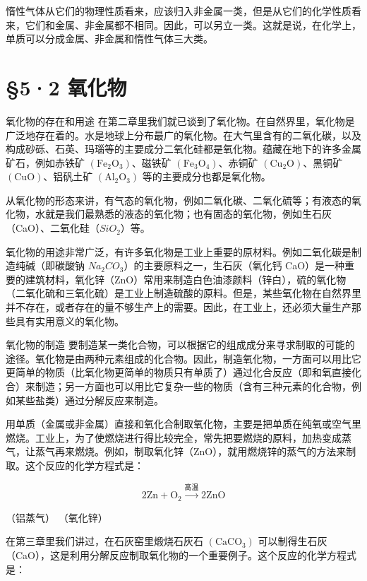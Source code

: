 惰性气体从它们的物理性质看来，应该归入非金属一类，但是从它们的化学性质看来，它们和金属、非金属都不相同。因此，可以另立一类。这就是说，在化学上，单质可以分成金属、非金属和惰性气体三大类。

\section{§5·2 氧化物}

氧化物的存在和用途
在第二章里我们就已谈到了氧化物。在自然界里，氧化物是广泛地存在着的。水是地球上分布最广的氧化物。在大气里含有的二氧化碳，以及构成砂砾、石英、玛瑙等的主要成分二氧化硅都是氧化物。蕴藏在地下的许多金属矿石，例如赤铁矿
\(\left(\mathrm{Fe}_{2}\mathrm{O}_{3}\right)\)、磁铁矿
\(\left(\mathrm{Fe}_{3}\mathrm{O}_{4}\right)\)、赤铜矿
\(\left(\mathrm{Cu}_{2}\mathrm{O}\right)\)、黑铜矿
\(\left(\mathrm{CuO}\right)\)、铝矾土矿
\(\left(\mathrm{Al}_{2}\mathrm{O}_{3}\right)\)
等的主要成分也都是氧化物。

从氧化物的形态来讲，有气态的氧化物，例如二氧化碳、二氧化硫等；有液态的氧化物，水就是我们最熟悉的液态的氧化物；也有固态的氧化物，例如生石灰（CaO）、二氧化硅（\(SiO_{2}\)）等。

氧化物的用途非常广泛，有许多氧化物是工业上重要的原材料。例如二氧化碳是制造纯碱（即碳酸钠
\(Na_{2}CO_{3}\)）的主要原料之一，生石灰（氧化钙
CaO）是一种重要的建筑材料，氧化锌（ZnO）常用来制造白色油漆颜料（锌白），硫的氧化物（二氧化硫和三氧化硫）是工业上制造硫酸的原料。但是，某些氧化物在自然界里并不存在，或者存在的量不够生产上的需要。因此，在工业上，还必须大量生产那些具有实用意义的氧化物。

氧化物的制造
要制造某一类化合物，可以根据它的组成成分来寻求制取的可能的途径。氧化物是由两种元素组成的化合物。因此，制造氧化物，一方面可以用比它更简单的物质（比氧化物更简单的物质只有单质了）通过化合反应（即和氧直接化合）来制造；另一方面也可以用比它复杂一些的物质（含有三种元素的化合物，例如某些盐类）通过分解反应来制造。

用单质（金属或非金属）直接和氧化合制取氧化物，主要是把单质在纯氧或空气里燃烧。工业上，为了使燃烧进行得比较完全，常先把要燃烧的原料，加热变成蒸气，让蒸气再来燃烧。例如，制取氧化锌（ZnO），就用燃烧锌的蒸气的方法来制取。这个反应的化学方程式是：

\[
2 \mathrm{Zn} + \mathrm{O}_{2} \xrightarrow {\text{高温}} 2 \mathrm{ZnO}
\]

（铝蒸气） （氧化锌）

在第三章里我们讲过，在石灰窑里煅烧石灰石
\(\left(\mathrm{CaCO}_{3}\right)\)
可以制得生石灰（CaO），这是利用分解反应制取氧化物的一个重要例子。这个反应的化学方程式是：

